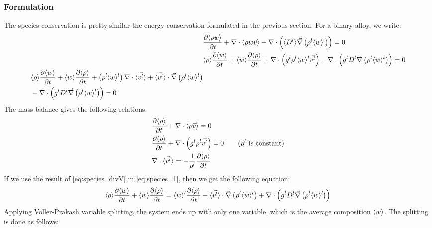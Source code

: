\subsubsection{Formulation}
The species conservation is pretty similar the energy conservation formulated in the previous section. For a binary alloy, we write:
%
%
\begin{subequations}
\begin{align}
 & \tempup{\avg{\rho w}} + \nabla \cdot \avg{\rho w \vec{v}} - \nabla  \cdot \brac{\avg{\Dl} \nabvec \brac{\rhol \wl} } = 0 \\
 & \avg{\rho} \tempup{\avg{w}} + \avg{w} \tempup{\avg{\rho}} 
	+ \nabla \cdot \brac{\gl \rhol \wl \vl} 
	- \nabla \cdot \brac{\gl \Dl \nabvec \brac{\rhol \wl} } = 0 \\
 \label{eq:species_1}
  \begin{split}
	& \avg{\rho} \tempup{\avg{w}}  + \avg{w} \tempup{\avg{\rho}} 
	+ \brac{\rhol \wl} \nabla \cdot \vit + \vit \cdot \nabvec \brac{\rhol \wl} \\
	& - \nabla \cdot \brac{\gl \Dl \nabvec \brac{\rhol \wl} } = 0 
  \end{split}
%
\end{align}
\end{subequations}
The mass balance gives the following relations:
\begin{subequations}
\begin{align}
& \frac{\partial \langle \rho \rangle}{\partial t}  + \nabla \cdot \langle \rho \vec{v} \rangle  = 0 \\ 
& \frac{\partial \langle \rho \rangle}{\partial t}  + \nabla \cdot \left( {g^l} \rho^l \vec{v^l} \right) = 0 \qquad (\rho^l \text{ is constant})\\ 
\label{eq:species_divV}
& \nabla \cdot \langle \vec{v^l} \rangle = - \frac{1}{\rho^l}\frac{\partial \langle \rho \rangle}{\partial t} 
\end{align}
\end{subequations}
If we use the result of \cref{eq:species_divV} in \cref{eq:species_1}, then we get the following equation:
\begin{align}
\langle \rho \rangle \frac{\partial \langle w \rangle}{\partial t}   + \langle w \rangle \frac{\partial \langle \rho \rangle}{\partial t}  =
\langle w \rangle^l \frac{\partial \langle \rho \rangle}{\partial t}   - \langle \vec{v^l} \rangle \cdot \vec{\nabla} \left( \rho^l \langle w \rangle^l \right) + \nabla \cdot \left( {g^l} D^l \vec{\nabla} \left( \rho^l \langle w \rangle^l \right)  \right)
\end{align}
%
Applying Voller-Prakash \citep{voller_modelling_1989} variable splitting, the system ends up with only one variable, which is the 
average composition $\langle w \rangle$. The splitting is done as follows:
